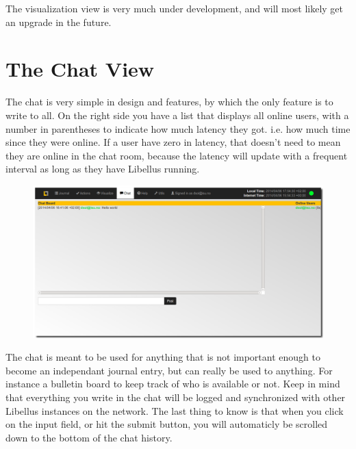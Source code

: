 \documentclass[letterpaper,10pt,english]{sphinxmanual}
\begin{document}
The visualization view is very much under development, and will most likely get an upgrade in the future.


\section{The Chat View}
\label{User manual:the-chat-view}
The chat is very simple in design and features, by which the only feature is to write to all. On the right side you have a list that displays all online users, with a number in parentheses to indicate how much latency they got. i.e. how much time since they were online. If a user have zero in latency, that doesn't need to mean they are online in the chat room, because the latency will update with a frequent interval as long as they have Libellus running.
\begin{figure}[htbp]
\centering

\includegraphics{chat.png}
\end{figure}

The chat is meant to be used for anything that is not important enough to become an independant journal entry, but can really be used to anything. For instance a bulletin board to keep track of who is available or not. Keep in mind that everything you write in the chat will be logged and synchronized with other Libellus instances on the network. The last thing to know is that when you click on the input field, or hit the submit button, you will automaticly be scrolled down to the bottom of the chat history.
\end{document}
